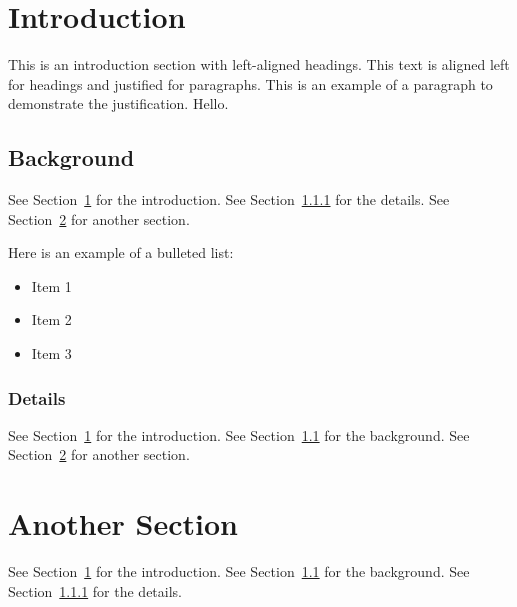 


\tableofcontents

\newpage %

\section{Introduction}
\label{sec:introduction}
This is an introduction section with left-aligned headings. This text is aligned left for headings and justified for paragraphs. This is an example of a paragraph to demonstrate the justification. Hello.

\subsection{Background}
\label{sec:background}
See Section~\ref{sec:introduction} for the introduction.
See Section~\ref{sec:details} for the details.
See Section~\ref{sec:another-section} for another section.

Here is an example of a bulleted list:
\begin{itemize}
  \item Item 1
  \item Item 2
  \item Item 3
\end{itemize}

\subsubsection{Details}
\label{sec:details}
See Section~\ref{sec:introduction} for the introduction.
See Section~\ref{sec:background} for the background.
See Section~\ref{sec:another-section} for another section.

\section{Another Section}
\label{sec:another-section}
See Section~\ref{sec:introduction} for the introduction.
See Section~\ref{sec:background} for the background.
See Section~\ref{sec:details} for the details.



